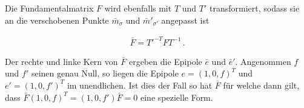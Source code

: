 Die Fundamentalmatrix $F$ wird ebenfalls mit $T$ und $T'$ transformiert, sodass sie an die verschobenen Punkte $\bar{m}_{\sigma}$ und $\bar{m}'_{\sigma'}$ angepasst ist
%

\begin{gather}
	\bar{F}= T'^{-T}FT^{-1} \, .
\end{gather}

Der rechte und linke Kern von $\bar{F}$ ergeben die Epipole $\bar{e}$ und $\bar{e}'$. Angenommen $f$ und $f'$ seinen genau Null, so liegen die Epipole $e = (1,0,f)^T$ und $e' = (1,0,f')^T$ im unendlichen. Ist dies der Fall so hat $\bar{F}$ für welche dann gilt, dass $\bar{F}(1,0,f)^T = (1,0,f')\bar{F}=0$ eine spezielle Form\cite{HZ}.







